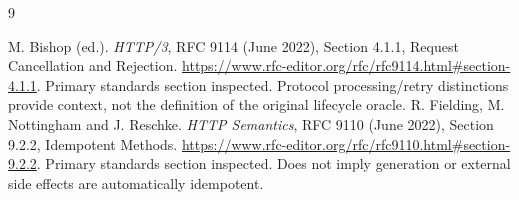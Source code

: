 \begin{thebibliography}{9}
 M. Bishop (ed.). \emph{HTTP/3}, RFC 9114
(June 2022), Section 4.1.1, Request Cancellation and Rejection.
\url{https://www.rfc-editor.org/rfc/rfc9114.html#section-4.1.1}.
Primary standards section inspected. Protocol processing/retry distinctions
provide context, not the definition of the original lifecycle oracle.
 R. Fielding, M. Nottingham and J. Reschke.
\emph{HTTP Semantics}, RFC 9110 (June 2022), Section 9.2.2, Idempotent Methods.
\url{https://www.rfc-editor.org/rfc/rfc9110.html#section-9.2.2}.
Primary standards section inspected. Does not imply generation or external
side effects are automatically idempotent.
\end{thebibliography}
